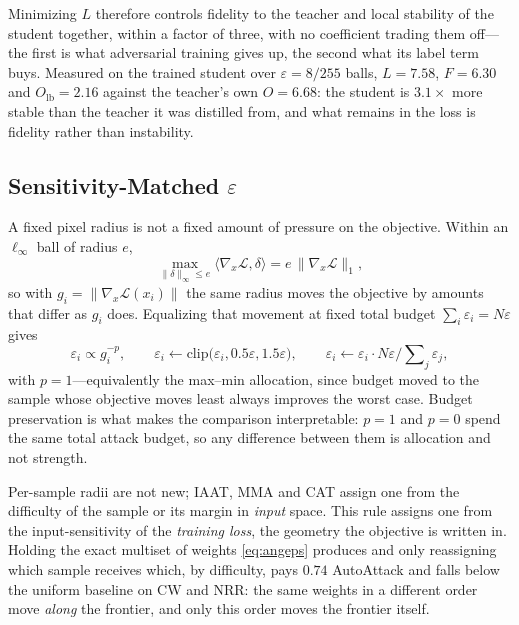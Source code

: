 Minimizing $L$ therefore controls fidelity to the teacher and local stability of the student together,
within a factor of three, with no coefficient trading them off---the first is what adversarial training
gives up, the second what its label term buys. Measured on the trained student over
$\varepsilon=8/255$ balls, $L=7.58$, $F=6.30$ and $O_{\mathrm{lb}}=2.16$ against the teacher's own
$O=6.68$: the student is $3.1\times$ more stable than the teacher it was distilled from, and what
remains in the loss is fidelity rather than instability.

\subsection{Sensitivity-Matched $\varepsilon$}
\label{sec:angeps}

A fixed pixel radius is not a fixed amount of pressure on the objective. Within an $\ell_\infty$ ball
of radius $e$,
\begin{equation}
\max_{\lVert\delta\rVert_\infty\le e}\langle\nabla_x\mathcal{L},\delta\rangle
=e\,\lVert\nabla_x\mathcal{L}\rVert_1,
\label{eq:firstorder}
\end{equation}
so with $g_i=\lVert\nabla_x\mathcal{L}(x_i)\rVert$ the same radius moves the objective by amounts that
differ as $g_i$ does. Equalizing that movement at fixed total budget $\sum_i\varepsilon_i=N\varepsilon$
gives
\begin{equation}
\varepsilon_i\propto g_i^{-p},\qquad
\varepsilon_i\leftarrow\mathrm{clip}\big(\varepsilon_i,0.5\varepsilon,1.5\varepsilon\big),\qquad
\varepsilon_i\leftarrow\varepsilon_i\cdot N\varepsilon\Big/\sum\nolimits_j\varepsilon_j,
\label{eq:angeps}
\end{equation}
with $p=1$---equivalently the max--min allocation, since budget moved to the sample whose objective
moves least always improves the worst case. Budget preservation is what makes the comparison
interpretable: $p{=}1$ and $p{=}0$ spend the same total attack budget, so any difference between them
is allocation and not strength.

Per-sample radii are not new; IAAT, MMA and CAT assign one from the difficulty of the sample or its
margin in \emph{input} space. This rule assigns one from the input-sensitivity of the \emph{training
loss}, the geometry the objective is written in. Holding the exact multiset of weights
\eqref{eq:angeps} produces and only reassigning which sample receives which, by difficulty, pays
$0.74$ AutoAttack and falls below the uniform baseline on CW and NRR: the same weights in a different
order move \emph{along} the frontier, and only this order moves the frontier itself.

